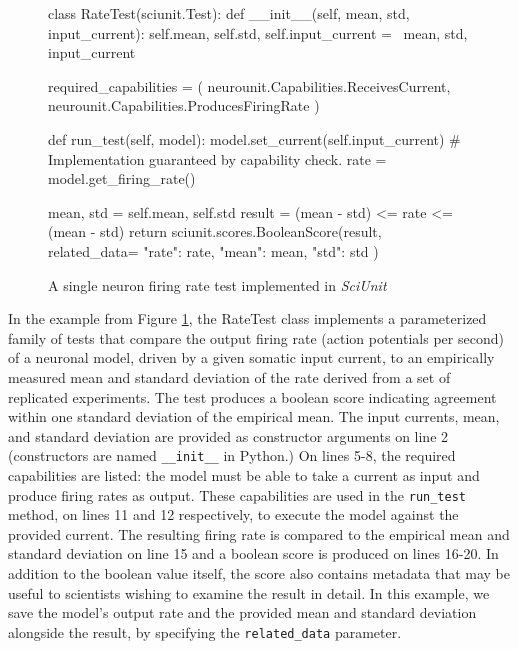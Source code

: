 \documentclass[11pt,letterpaper]{article}
\begin{document}
\begin{figure}
\caption{A single neuron firing rate test implemented in \textit{SciUnit}}
\label{fig:rate_test}
\begin{python}
class RateTest(sciunit.Test):
	def __init__(self, mean, std, input_current):
		self.mean, self.std, self.input_current = \
		mean, std, input_current
	
	required_capabilities = (
		neurounit.Capabilities.ReceivesCurrent,
		neurounit.Capabilities.ProducesFiringRate
	)
	
	def run_test(self, model):
		model.set_current(self.input_current) 
		# Implementation guaranteed by capability check.  
		rate = model.get_firing_rate()
		
		mean, std = self.mean, self.std
		result = (mean - std) <= rate <= (mean - std)
		return sciunit.scores.BooleanScore(result, related_data={
			"rate": rate,
			"mean": mean,
			"std": std
		})
\end{python}
\vspace{-18px}
\end{figure}

In the example from Figure \ref{fig:rate_test}, the RateTest class implements a parameterized family of tests that compare the output firing rate (action potentials per second) of a neuronal model, driven by a given somatic input current, to an empirically measured mean and standard deviation of the rate derived from a set of replicated experiments. The test produces a boolean score indicating agreement within one standard deviation of the empirical mean. The input currents, mean, and standard deviation are provided as constructor arguments on line 2 (constructors are named \verb|__init__| in Python.) On lines 5-8, the required capabilities are listed: the model must be able to take a current as input and produce firing rates as output. These capabilities are used in the \verb|run_test| method, on lines 11 and 12 respectively, to execute the model against the provided current. The resulting firing rate is compared to the empirical mean and standard deviation on line 15 and a boolean score is produced on lines 16-20. In addition to the boolean value itself, the score also contains metadata that may be useful to scientists wishing to examine the result in detail. In this example, we save the model's output rate and the provided mean and standard deviation alongside the result, by specifying the \verb|related_data| parameter.  
\end{document}
